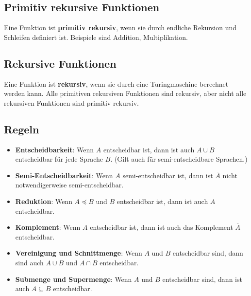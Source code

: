 \documentclass{article}
\begin{document}
\begin{minipage}[t]{0.45\textwidth}
    \subsection*{Primitiv rekursive Funktionen}
    Eine Funktion ist \textbf{primitiv rekursiv}, wenn sie durch endliche Rekursion und Schleifen definiert ist. Beispiele sind Addition, Multiplikation.

    \subsection*{Rekursive Funktionen}
    Eine Funktion ist \textbf{rekursiv}, wenn sie durch eine Turingmaschine berechnet werden kann. Alle primitiven rekursiven Funktionen sind rekursiv, aber nicht alle rekursiven Funktionen sind primitiv rekursiv.

    \subsection*{Regeln}
    \begin{itemize}
        \item \textbf{Entscheidbarkeit}: Wenn $A$ entscheidbar ist, dann ist auch $A \cup B$ entscheidbar für jede Sprache $B$. (Gilt auch für semi-entscheidbare Sprachen.)
        \item \textbf{Semi-Entscheidbarkeit}: Wenn $A$ semi-entscheidbar ist, dann ist $\overline{A}$ nicht notwendigerweise semi-entscheidbar.
        \item \textbf{Reduktion}: Wenn $A \preceq B$ und $B$ entscheidbar ist, dann ist auch $A$ entscheidbar.
        \item \textbf{Komplement}: Wenn $A$ entscheidbar ist, dann ist auch das Komplement $\overline{A}$ entscheidbar.
        \item \textbf{Vereinigung und Schnittmenge}: Wenn $A$ und $B$ entscheidbar sind, dann sind auch $A \cup B$ und $A \cap B$ entscheidbar.
        \item \textbf{Submenge und Supermenge}: Wenn $A$ und $B$ entscheidbar sind, dann ist auch $A \subseteq B$ entscheidbar.
    \end{itemize}
\end{minipage}
\hfill
\end{document}
